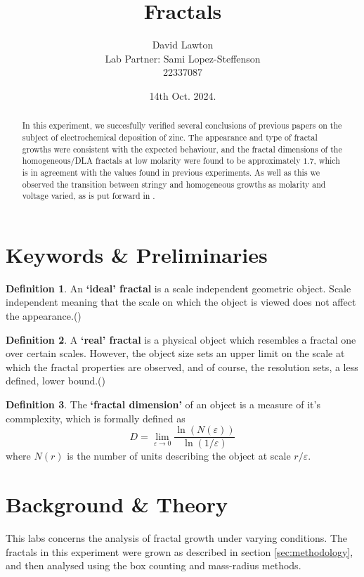 \documentclass{article}
\title{Fractals}
\author{David Lawton\\
        Lab Partner: Sami Lopez-Steffenson\\
        22337087}
\date{14th Oct. 2024.}
\theoremstyle{definition}
\newtheorem{definition}{Definition}[section]
\theoremstyle{remark}
\begin{document}
\maketitle

\tableofcontents
{}
\begin{abstract}
        In this experiment, we succesfully verified several conclusions of previous papers on the subject of electrochemical deposition of zinc. The appearance and type of fractal growths were consistent with the expected behaviour, and the fractal dimensions of the homogeneous/DLA fractals at low molarity were found to be approximately $1.7$, which is in agreement with the values found in previous experiments. As well as this we observed the transition between stringy and homogeneous growths as molarity and voltage varied, as is put forward in \cite{PhysRevLett.59.2315}.
\end{abstract}

\section{Keywords \& Preliminaries}\label{sec:keywords}
\begin{definition}
        An \textbf{`ideal' fractal} is a scale independent geometric object. Scale independent meaning that the scale on which the object is viewed does not affect the appearance.(\cite{LabHandbook})
\end{definition}
\begin{definition}
        A \textbf{`real' fractal} is a physical object which resembles a fractal one over certain scales. However, the object size sets an upper limit on the scale at which the fractal properties are observed, and of course, the resolution sets, a less defined, lower bound.(\cite{LabHandbook})
\end{definition}
\begin{definition}
        The \textbf{`fractal dimension'} of an object is a measure of it's commplexity, which is formally defined as
\begin{equation}
        \label{eq:fractal_dimension}
        D = \lim_{\varepsilon \to 0} \frac{\ln(N(\varepsilon))}{\ln(1/\varepsilon)}
\end{equation}
        where $N(r)$ is the number of units describing the object at scale $r/\varepsilon$.
\end{definition}
\section{Background \& Theory}\label{sec:background}
This labs concerns the analysis of fractal growth under varying conditions. The fractals in this experiment were grown as described in section \ref{sec:methodology}, and then analysed using the box counting and mass-radius methods.\\
\end{document}
